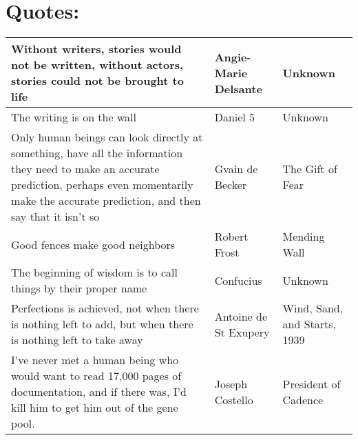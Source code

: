 \documentclass{article}
\begin{document}
\section*{Quotes:}
    \begin{tabularx}{0.8\textwidth} { 
        | >{\centering\arraybackslash}X 
        | >{\centering\arraybackslash}X 
        |  >{\centering\arraybackslash}X |}
        
        \hline

        Without writers, stories would not be written, without actors, stories could not be brought to life
        & Angie-Marie Delsante
        & Unknown \\

        \hline

        The writing is on the wall 
        & Daniel 5 
        & Unknown \\

        \hline

        Only human beings can look directly at something, have all the information they need to make an accurate prediction, perhaps even momentarily make the accurate prediction, and then say that it isn't so
        & Gvain de Becker
        & The Gift of Fear
        \\

        \hline

        Good fences make good neighbors 
        & Robert Frost
        &Mending Wall \\

        \hline

        The beginning of wisdom is to call things by their proper name
        & Confucius
        & Unknown
        \\

        \hline

        Perfections is achieved, not when there is nothing left to add, but when there is nothing left to take away
        & Antoine de St Exupery
        & Wind, Sand, and Starts, 1939 \\

        \hline

        I've never met a human being who would want to read 17,000 pages of documentation, and if there was, I'd kill him to get him out of the gene pool.
        & Joseph Costello
        & President of Cadence 
        \\

        \hline
    
        \hline
    \end{tabularx}
\end{document}
